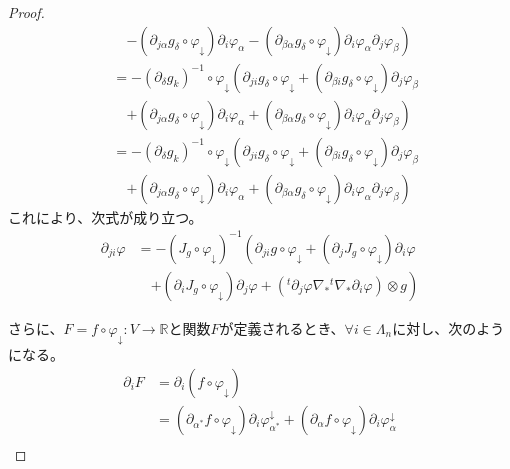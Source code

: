 \documentclass[dvipdfmx]{jsarticle}
\begin{document}
\begin{proof}
\begin{align*}
&\quad \left. - \left( \partial_{j\alpha}g_{\delta} \circ \varphi_{\downarrow} \right)\partial_{i}\varphi_{\alpha} - \left( \partial_{\beta\alpha}g_{\delta} \circ \varphi_{\downarrow} \right)\partial_{i}\varphi_{\alpha}\partial_{j}\varphi_{\beta} \right)\\
&= - \left( \partial_{\delta}g_{k} \right)^{- 1} \circ \varphi_{\downarrow}\left( \partial_{ji}g_{\delta} \circ \varphi_{\downarrow} + \left( \partial_{\beta i}g_{\delta} \circ \varphi_{\downarrow} \right)\partial_{j}\varphi_{\beta} \right. \\
&\quad \left. + \left( \partial_{j\alpha}g_{\delta} \circ \varphi_{\downarrow} \right)\partial_{i}\varphi_{\alpha} + \left( \partial_{\beta\alpha}g_{\delta} \circ \varphi_{\downarrow} \right)\partial_{i}\varphi_{\alpha}\partial_{j}\varphi_{\beta} \right)\\
&= - \left( \partial_{\delta}g_{k} \right)^{- 1} \circ \varphi_{\downarrow}\left( \partial_{ji}g_{\delta} \circ \varphi_{\downarrow} + \left( \partial_{\beta i}g_{\delta} \circ \varphi_{\downarrow} \right)\partial_{j}\varphi_{\beta} \right. \\
&\quad \left. + \left( \partial_{j\alpha}g_{\delta} \circ \varphi_{\downarrow} \right)\partial_{i}\varphi_{\alpha} + \left( \partial_{\beta\alpha}g_{\delta} \circ \varphi_{\downarrow} \right)\partial_{i}\varphi_{\alpha}\partial_{j}\varphi_{\beta} \right)
\end{align*}
これにより、次式が成り立つ。
\begin{align*}
\partial_{ji}\varphi &= - \left( J_{g} \circ \varphi_{\downarrow} \right)^{- 1}\left( \partial_{ji}g \circ \varphi_{\downarrow} + \left( \partial_{j}J_{g} \circ \varphi_{\downarrow} \right)\partial_{i}\varphi \right. \\
&\quad \left. + \left( \partial_{i}J_{g} \circ \varphi_{\downarrow} \right)\partial_{j}\varphi + \left({}^t \partial_{j}\varphi\nabla_{*}{}^{t}\nabla_{*}\partial_{i}\varphi \right) \otimes g \right)
\end{align*}\par
さらに、$F = f \circ \varphi_{\downarrow}:V \rightarrow \mathbb{R}$と関数$F$が定義されるとき、$\forall i \in \varLambda_{n}$に対し、次のようになる。
\begin{align*}
\partial_{i}F &= \partial_{i}\left( f \circ \varphi_{\downarrow} \right)\\
&= \left( \partial_{\alpha^{*}}f \circ \varphi_{\downarrow} \right)\partial_{i}\varphi_{\alpha^{*}}^{\downarrow} + \left( \partial_{\alpha}f \circ \varphi_{\downarrow} \right)\partial_{i}\varphi_{\alpha}^{\downarrow}\\

\end{align*}
\end{proof}
\end{document}
